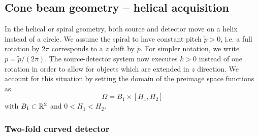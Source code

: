 \documentclass{amsart}
\begin{document}
\subsection{Cone beam geometry -- helical acquisition}
\label{sec:applications:cone_helical}

In the helical or spiral geometry, both source and detector move on a helix instead of a circle. We assume the spiral to have constant 
pitch $\tilde p>0$, i.e. a full rotation by $2\pi$ corresponds to a $z$ shift by $\tilde p$. For simpler notation, we write 
$p = \tilde p/(2\pi)$. The source-detector system now executes $k > 0$ instead of one rotation in order to allow for objects which 
are extended in $z$ direction. We account for this situation by setting the domain of the preimage space functions as
%
\begin{equation}
 \label{eq:hcone:cylinderdomain}
 \Omega = B_1 \times [H_1, H_2]
\end{equation}
%
with $B_1 \subset {\ensuremath{\mathbb{R}}}^2$ and $0 < H_1 < H_2$.

\subsubsection{Two-fold curved detector}
\label{sec:applications:cone_helical:twofoldcurved}
\end{document}
